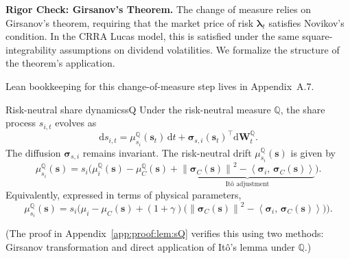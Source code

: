 \documentclass[11pt,letterpaper,oneside]{article}
\numberwithin{equation}{section}
\newcommand{\1}{\mathbf{1}}
\newcommand{\diff}{\mathrm{d}}
\newcommand{\norm}[1]{\left\lVert #1\right\rVert}
\newcommand{\ip}[2]{\left\langle #1,\,#2\right\rangle}
\begin{document}
\begin{tcolorbox}[mathstyle]
  	\textbf{Rigor Check: Girsanov's Theorem.} The change of measure relies on Girsanov's theorem, requiring that the market price of risk $\bm{\lambda}_t$ satisfies Novikov's condition. In the CRRA Lucas model, this is satisfied under the same square-integrability assumptions on dividend volatilities. We formalize the structure of the theorem's application.
    \begin{leanproof}[title={Structure: Girsanov Transformation}]
  Lean bookkeeping for this change-of-measure step lives in Appendix~A.7.
  \end{leanproof}

\end{tcolorbox}

\begin{lemma}{Risk-neutral share dynamics}{sQ}
Under the risk-neutral measure $\mathbb{Q}$, the share process $s_{i,t}$ evolves as
\begin{equation}\label{eq:s_drift_Q}
  \diff s_{i,t}=\mu_{s_i}^{\mathbb{Q}}(\bm{s}_t)\,\diff t+\bm{\sigma}_{s,i}(\bm{s}_t)^{\top}\diff\bm{W}_t^{\mathbb{Q}}.
\end{equation}
The diffusion $\bm{\sigma}_{s,i}$ remains invariant. The risk-neutral drift $\mu_{s_i}^{\mathbb{Q}}(\bm{s})$ is given by
\begin{equation}\label{eq:mu_s_Q_correct}
  \mu_{s_i}^{\mathbb{Q}}(\bm{s}) = s_i\Big( \mu_i^{\mathbb{Q}}(\bm{s}) - \mu_C^{\mathbb{Q}}(\bm{s}) + \underbrace{\norm{\bm{\sigma}_C(\bm{s})}^2 - \ip{\bm{\sigma}_i}{\bm{\sigma}_C(\bm{s})}}_{\text{It\^o adjustment}} \Big).
\end{equation}
Equivalently, expressed in terms of physical parameters,
\begin{equation}\label{eq:mu_s_Q_physical}
  \mu_{s_i}^{\mathbb{Q}}(\bm{s}) = s_i\Big( \mu_i - \mu_C(\bm{s}) + (1+\gamma)
\big(\norm{\bm{\sigma}_C(\bm{s})}^2 - \ip{\bm{\sigma}_i}{\bm{\sigma}_C(\bm{s})}\big) \Big).
\end{equation}
\end{lemma}
(The proof in Appendix~\ref{app:proof:lem:sQ} verifies this using two methods: Girsanov transformation and direct application of It\^o's lemma under $\mathbb{Q}$.)
\end{document}
